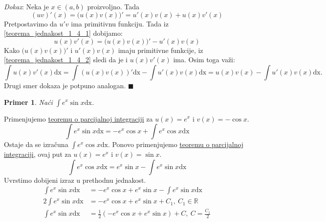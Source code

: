 \documentclass{article}
\newtheorem{prim}{Primer}[section]
\begin{document}
\textit{Dokaz}: Neka je $x \in \left(a, b\right)$ proizvoljno. Tada
\begin{equation}\label{teorema_jednakost_1_4_1}
    \left(uv\right)'\left(x\right) = \bigl(u\left(x\right) v\left(x\right)\bigr)' = u'\left(x\right)v\left(x\right) + u\left(x\right)v'\left(x\right)
\end{equation}
Pretpostavimo da $u'v$ ima primitivnu funkciju. Tada iz \eqref{teorema_jednakost_1_4_1} dobijamo:
\begin{equation}\label{teorema_jednakost_1_4_2}
    u\left(x\right)v'\left(x\right) = \bigl(u\left(x\right) v\left(x\right)\bigr)' - u'\left(x\right)v\left(x\right)
\end{equation}
Kako $\bigl(u\left(x\right)v\left(x\right)\bigr)'$ i $u'\left(x\right)v\left(x\right)$ imaju primitivne funkcije,
iz \eqref{teorema_jednakost_1_4_2} sledi da je i $u\left(x\right)v'\left(x\right)$ ima. Osim toga važi:
$$\int u\left(x\right)v'\left(x\right)\text{dx} = \int\left(u\left(x\right)v\left(x\right)\right)'\text{dx} - \int u'\left(x\right)v\left(x\right)\text{dx} = u\left(x\right)v\left(x\right) -\int u'\left(x\right)v\left(x\right)\text{dx}.$$
Drugi smer dokaza je potpuno analogan.
\null\hfill $\blacksquare$\par

\begin{primbox}
    \label{primer_1.13}
    \begin{prim}
        Naći $\displaystyle\int e^x \sin x \text{dx}$.
    \end{prim}
    Primenjujemo \hyperref[teorema_1.4]{teoremu o parcijalnoj integraciji} za $u\left(x\right) = e^x$ i $v\left(x\right) = -\cos x$.
    $$\displaystyle\int e^x\sin x \text{dx} = -e^x\cos x + \int e^x \cos x\text{dx}$$
    Ostaje da se izračuna $\displaystyle\int e^x\cos x \text{dx}$. Ponovo primenjujemo \hyperref[teorema_1.4]{teoremu o parcijalnoj integraciji}, ovaj
    put za $u\left(x\right) = e^x$ i $ v\left(x\right) = \sin x$.
    $$\displaystyle\int e^x\cos x \text{dx} = e^x\sin x - \int e^x\sin x \text{dx}$$
    Uvrstimo dobijeni izraz u prethodnu jednakost.
    \begin{align*}
        \int e^x \sin x \text{dx}  & = -e^x\cos x + e^x \sin x - \int e^x \sin x \text{dx}                 \\
        2\int e^x \sin x \text{dx} & = -e^x\cos x + e^x \sin x +C_1,\ C_1\in\mathbb{R}                     \\
        \int e^x \sin x \text{dx}  & = \frac{1}{2}\left(-e^x\cos x + e^x \sin x\right)+C,\ C=\frac{C_1}{2}
    \end{align*}
\end{primbox}
\end{document}
